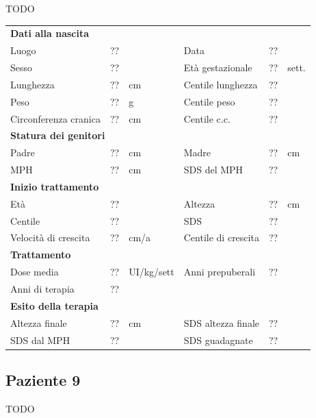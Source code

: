 TODO

\begin{table}[!h]
\begin{tabular}{lrllrl}
\toprule
\multicolumn{6}{l}{\textbf{Dati alla nascita}}\\
Luogo 		& \multicolumn{2}{l}{??} 	& Data 					& \multicolumn{2}{l}{??} 	\\
Sesso 		& \multicolumn{2}{l}{??} 	& Età gestazionale 		& ?? 		& sett.\\
Lunghezza 	& ?? 		& cm 				& Centile lunghezza		& ?? 		\\
Peso 		& ?? 		& g					& Centile peso			& ?? 		\\
Circonferenza cranica	& ?? 		& cm 	& Centile c.c.			& ?? \\
\midrule
\multicolumn{6}{l}{\textbf{Statura dei genitori}}\\
Padre 		& ?? & cm 	& Madre 				& ?? & cm \\
MPH 		& ?? & cm 	& SDS del MPH 			& ??\\
\midrule
\multicolumn{6}{l}{\textbf{Inizio trattamento}} \\
Età	& ?? & 		& Altezza 				& ?? & cm  \\
Centile & ?? 	 &		& SDS		& ?? \\
Velocità di crescita & ?? & cm/a	& Centile di crescita & ??\\
\midrule
\multicolumn{6}{l}{\textbf{Trattamento}} \\
Dose media		& ?? & UI/kg/sett & Anni prepuberali & ??\\
Anni di terapia & ??\\
\midrule
\multicolumn{6}{l}{\textbf{Esito della terapia}} \\
Altezza finale			& ?? & cm 	& SDS altezza finale		& ??\\
SDS dal MPH				& ?? &		& SDS guadagnate 			& ??\\
\bottomrule
\end{tabular}
\end{table}
\clearpage


\subsection*{Paziente 9}

TODO

